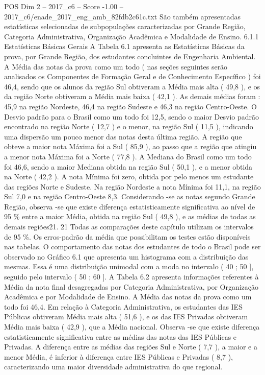 \begin{textsample}{POS Dim 2 – 2017\_c6 – Score -1.00 – 2017\_c6/enade\_2017\_eng\_amb\_82fdb2c61c.txt}
São também apresentadas estatísticas selecionadas de subpopulações caracterizadas por Grande Região, Categoria Administrativa, Organização Acadêmica e Modalidade de Ensino. 6.1.1 Estatísticas Básicas Gerais A Tabela 6.1 apresenta as Estatísticas Básicas da prova, por Grande Região, dos estudantes concluintes de Engenharia Ambiental.
A Média das notas da prova como um todo ( nas seções seguintes serão analisados os Componentes de Formação Geral e de Conhecimento Específico ) foi 46,4, sendo que os alunos da região Sul obtiveram a Média mais alta ( 49,8 ), e os da região Norte obtiveram a Média mais baixa ( 42,1 ).
As demais médias foram : 45,9 na região Nordeste, 46,4 na região Sudeste e 46,3 na região Centro-Oeste.
O Desvio padrão para o Brasil como um todo foi 12,5, sendo o maior Desvio padrão encontrado na região Norte ( 12,7 ) e o menor, na região Sul ( 11,5 ), indicando uma dispersão um pouco menor das notas desta última região.
A região que obteve a maior nota Máxima foi a Sul ( 85,9 ), ao passo que a região que atingiu a menor nota Máxima foi a Norte ( 77,8 ).
A Mediana do Brasil como um todo foi 46,6, sendo a maior Mediana obtida na região Sul ( 50,1 ), e a menor obtida na Norte ( 42,2 ).
A nota Mínima foi zero, obtida por pelo menos um estudante das regiões Norte e Sudeste.
Na região Nordeste a nota Mínima foi 11,1, na região Sul 7,0 e na região Centro-Oeste 8,3.
Considerando -se as notas segundo Grande Região, observa -se que existe diferença estatisticamente significativa ao nível de 95 \% entre a maior Média, obtida na região Sul ( 49,8 ), e as médias de todas as demais regiões21. 21 Todas as comparações deste capítulo utilizam os intervalos de 95 \%.
Os erros-padrão da média que possibilitam os testes estão disponíveis nas tabelas.
O comportamento das notas dos estudantes de todo o Brasil pode ser observado no Gráfico 6.1 que apresenta um histograma com a distribuição das mesmas.
Essa é uma distribuição unimodal com a moda no intervalo ( 40 ; 50 ], seguido pelo intervalo ( 50 ; 60 ].
A Tabela 6.2 apresenta informações referentes à Média da nota final desagregadas por Categoria Administrativa, por Organização Acadêmica e por Modalidade de Ensino.
A Média das notas da prova como um todo foi 46,4.
Em relação à Categoria Administrativa, os estudantes das IES Públicas obtiveram Média mais alta ( 51,6 ), e os das IES Privadas obtiveram Média mais baixa ( 42,9 ), que a Média nacional.
Observa -se que existe diferença estatisticamente significativa entre as médias das notas das IES Públicas e Privadas.
A diferença entre as médias das regiões Sul e Norte ( 7,7 ), a maior e a menor Média, é inferior à diferença entre IES Públicas e Privadas ( 8,7 ), caracterizando uma maior diversidade administrativa do que regional.

\end{textsample}
